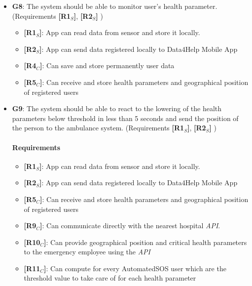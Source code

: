 \begin{itemize}
   
   
   
   
    \item \textbf{G8}: The system should be able to monitor user's health parameter. (Requirements \textbf{[R1$_S$]}, \textbf{[R2$_S$]} )
    
    
    
   \begin{itemize}
       \item \textbf{[R1$_S$]}: App can read data from sensor and store it locally.
        \item \textbf{[R2$_S$]}: App can send data registered locally to Data4Help Mobile App
        \item \textbf{[R4$_C$]}: Can save and store permanently user data
    \item \textbf{[R5$_C$]}: Can receive and store health parameters and geographical position of registered users

   \end{itemize}
   
   
   
   
    \item \textbf{G9}: The system should be able to react to the lowering of the health parameters below threshold in less than 5 seconds and send the position of the person to the ambulance system.  (Requirements \textbf{[R1$_S$]}, \textbf{[R2$_S$]} )
    \paragraph{Requirements}
   \begin{itemize}
    \item \textbf{[R1$_S$]}: App can read data from sensor and store it locally.
    \item \textbf{[R2$_S$]}: App can send data registered locally to Data4Help Mobile App

    \item \textbf{[R5$_C$]}: Can receive and store health parameters and geographical position of registered users

    \item \textbf{[R9$_C$]}: Can communicate directly with the nearest hospital \textit{API}.
    \item \textbf{[R10$_C$]}: Can provide geographical position and critical health parameters to the emergency employee using the \textit{API}
    \item \textbf{[R11$_C$]}: Can compute for every AutomatedSOS user which are the threshold value to take care of for each health parameter


\end{itemize}
\end{itemize}
